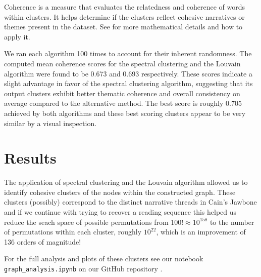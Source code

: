 \documentclass[a4paper]{article}
\begin{document}
Coherence is a measure that evaluates the relatedness and coherence of words within clusters. It helps determine if the clusters reflect cohesive narratives or themes present in the dataset. See \cite{coherence} for more mathematical details and how to apply it.

We ran each algorithm 100 times to account for their inherent randomness. The computed mean coherence scores for the spectral clustering and the Louvain algorithm were found to be 0.673 and 0.693 respectively. These scores indicate a slight advantage in favor of the spectral clustering algorithm, suggesting that its output clusters exhibit better thematic coherence and overall consistency on average compared to the alternative method. The best score is roughly 0.705 achieved by both algorithms and these best scoring clusters appear to be very similar by a visual inspection.


\section{Results}

The application of spectral clustering and the Louvain algorithm allowed us to identify cohesive clusters of the nodes within the constructed graph. These clusters (possibly) correspond to the distinct narrative threads in Cain's Jawbone and if we continue with trying to recover a reading sequence this helped us reduce the seach space of possible permutations from $100! \approx 10^{158}$ to the number of permutations within each cluster, roughly $10^{22}$, which is an improvement of 136 orders of magnitude!

For the full analysis and plots of these clusters see our notebook \\ \verb|graph_analysis.ipynb| on our GitHub repository \cite{github}.


\printbibliography
\end{document}
